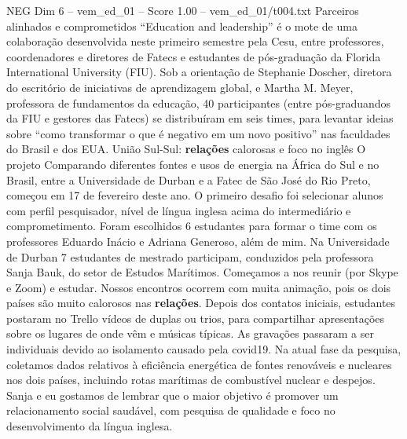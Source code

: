 \begin{textsample}{NEG Dim 6 – vem\_ed\_01 – Score 1.00 – vem\_ed\_01/t004.txt}  \label{ex:f6_neg_082}
Parceiros alinhados e comprometidos “Education and leadership” é o mote de uma colaboração desenvolvida neste primeiro semestre pela Cesu, entre professores, coordenadores e diretores de Fatecs e estudantes de pós-graduação da Florida International University (FIU).
Sob a orientação de Stephanie Doscher, diretora do escritório de iniciativas de aprendizagem global, e Martha M.
Meyer, professora de fundamentos da educação, 40 participantes (entre pós-graduandos da FIU e gestores das Fatecs) se distribuíram em seis times, para levantar ideias sobre “como transformar o que é negativo em um novo positivo” nas faculdades do Brasil e dos EUA.
União Sul-Sul: \textbf{relações} calorosas e foco no inglês O projeto Comparando diferentes fontes e usos de energia na África do Sul e no Brasil, entre a Universidade de Durban e a Fatec de São José do Rio Preto, começou em 17 de fevereiro deste ano.
O primeiro desafio foi selecionar alunos com perfil pesquisador, nível de língua inglesa acima do intermediário e comprometimento.
Foram escolhidos 6 estudantes para formar o time com os professores Eduardo Inácio e Adriana Generoso, além de mim.
Na Universidade de Durban 7 estudantes de mestrado participam, conduzidos pela professora Sanja Bauk, do setor de Estudos Marítimos.
Começamos a nos reunir (por Skype e Zoom) e estudar.
Nossos encontros ocorrem com muita animação, pois os dois países são muito calorosos nas \textbf{relações}.
Depois dos contatos iniciais, estudantes postaram no Trello vídeos de duplas ou trios, para compartilhar apresentações sobre os lugares de onde vêm e músicas típicas.
As gravações passaram a ser individuais devido ao isolamento causado pela covid19.
Na atual fase da pesquisa, coletamos dados relativos à eficiência energética de fontes renováveis e nucleares nos dois países, incluindo rotas marítimas de combustível nuclear e despejos.
Sanja e eu gostamos de lembrar que o maior objetivo é promover um relacionamento social saudável, com pesquisa de qualidade e foco no desenvolvimento da língua inglesa.

\end{textsample}
